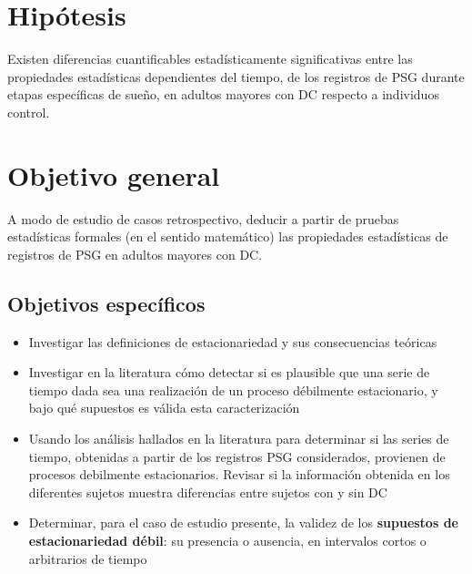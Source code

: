
\section{Hip\'otesis}

Existen diferencias cuantificables estad\'isticamente significativas entre las propiedades
estad\'isticas dependientes del tiempo, de los registros de PSG
durante etapas espec\'ificas de sue\~no, en adultos
mayores con DC respecto a individuos control.


\section{Objetivo general}

A modo de estudio de casos retrospectivo,
deducir a partir de pruebas estad\'isticas formales (en el sentido matem\'atico) las propiedades
estad\'isticas de registros de PSG en adultos mayores con DC.


\subsection{Objetivos espec\'ificos}

\begin{itemize}
\item Investigar las definiciones de estacionariedad y sus consecuencias te\'oricas

\item Investigar en la literatura c\'omo detectar si es plausible que una serie de tiempo 
dada sea una realizaci\'on de un proceso d\'ebilmente estacionario, 
y bajo qu\'e supuestos es v\'alida esta caracterizaci\'on

\item Usando los an\'alisis hallados en la literatura para determinar si las series de tiempo,
obtenidas a partir de los registros PSG considerados, provienen de procesos
debilmente estacionarios.
Revisar si la informaci\'on obtenida en los diferentes sujetos muestra diferencias entre
sujetos con y sin DC

\item Determinar, para el caso de estudio presente, la validez de los \textbf{supuestos de 
estacionariedad d\'ebil}: su presencia o ausencia, en intervalos cortos o arbitrarios de tiempo
\end{itemize}

